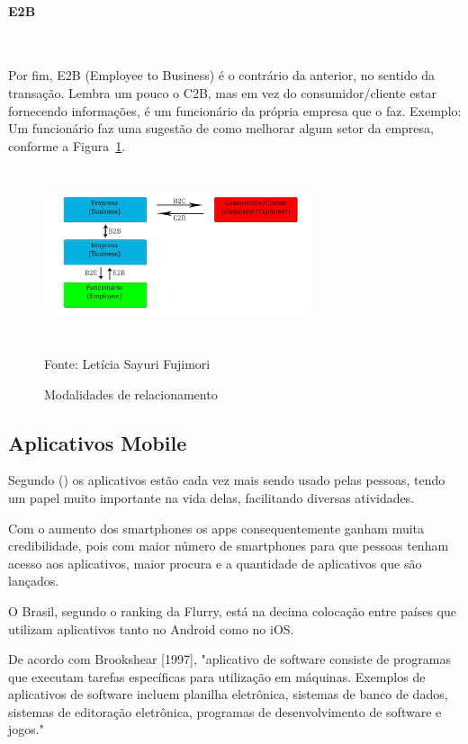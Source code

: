 \paragraph{E2B}\mbox{}\\
\par
Por fim, E2B (Employee to Business) é o contrário da anterior, no sentido da transação. Lembra um pouco o C2B, mas em vez do consumidor/cliente estar fornecendo informações, é um funcionário da própria empresa que o faz. Exemplo: Um funcionário faz uma sugestão de como melhorar algum setor da empresa, conforme a Figura~\hypersetup{linkcolor=black}\ref{fig:Modalidades}.
 \begin{figure}[!h]
	\centering
	\caption{Modalidades de relacionamento}
	\label{fig:Modalidades}
	\includegraphics[width=300px, height=190px]{./images/2-7.jpg}
	\par{Fonte: Letícia Sayuri Fujimori}
\end{figure}

\subsection{Aplicativos Mobile}
Segundo (\cite{aplicativos-mobile}) os aplicativos estão cada vez mais sendo usado pelas pessoas, tendo um papel muito importante na vida delas, facilitando diversas atividades.

Com o aumento dos smartphones os apps consequentemente ganham muita credibilidade, pois com maior número de smartphones para que pessoas tenham acesso aos aplicativos, maior procura e a quantidade de aplicativos que são lançados.

O Brasil, segundo o ranking da Flurry, está na decima colocação entre países que utilizam aplicativos tanto no Android como no iOS.

De acordo com Brookshear [1997], "aplicativo de software consiste de programas que executam tarefas específicas para utilização em máquinas. Exemplos de aplicativos de software incluem planilha eletrônica, sistemas de banco de dados, sistemas de editoração eletrônica, programas de desenvolvimento de software e jogos."

